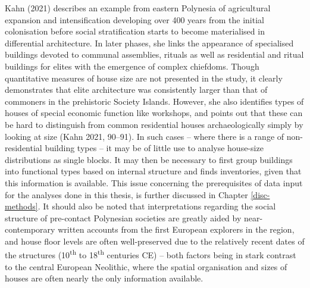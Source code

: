 \documentclass[
  12pt,
  a4paper, twoside]{book}
\begin{document}
Kahn (2021) describes an example from eastern Polynesia of agricultural expansion and intensification developing over 400 years from the initial colonisation before social stratification starts to become materialised in differential architecture. In later phases, she links the appearance of specialised buildings devoted to communal assemblies, rituals as well as residential and ritual buildings for elites with the emergence of complex chiefdoms. Though quantitative measures of house size are not presented in the study, it clearly demonstrates that elite architecture was consistently larger than that of commoners in the prehistoric Society Islands. However, she also identifies types of houses of special economic function like workshops, and points out that these can be hard to distinguish from common residential houses archaeologically simply by looking at size (Kahn 2021, 90--91). In such cases -- where there is a range of non-residential building types -- it may be of little use to analyse house-size distributions as single blocks. It may then be necessary to first group buildings into functional types based on internal structure and finds inventories, given that this information is available. This issue concerning the prerequisites of data input for the analyses done in this thesis, is further discussed in Chapter \ref{disc-methods}. It should also be noted that interpretations regarding the social structure of pre-contact Polynesian societies are greatly aided by near-contemporary written accounts from the first European explorers in the region, and house floor levels are often well-preserved due to the relatively recent dates of the structures (10\textsuperscript{th} to 18\textsuperscript{th} centuries CE) -- both factors being in stark contrast to the central European Neolithic, where the spatial organisation and sizes of houses are often nearly the only information available.
\end{document}
